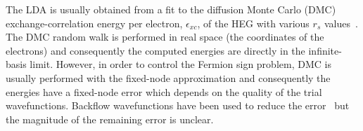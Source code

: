 The LDA is usually obtained from a fit to the diffusion Monte Carlo (DMC) exchange-correlation energy
per electron, $\epsilon_{xc}$, of the HEG with various $r_s$ values~\cite{CepAld-PRL-80}.
The DMC random walk is performed in real space (the coordinates of the electrons) and consequently
the computed energies are directly in the infinite-basis limit.
However, in order to control the Fermion sign problem, DMC is usually performed with the fixed-node approximation
and consequently the energies have a fixed-node error which depends on the
quality of the trial wavefunctions.
Backflow wavefunctions have been used to reduce the error~\cite{KwoCepMar-PRB-98,RioMaDruTowNee-PRE-06}
but the magnitude of the remaining error is unclear.


